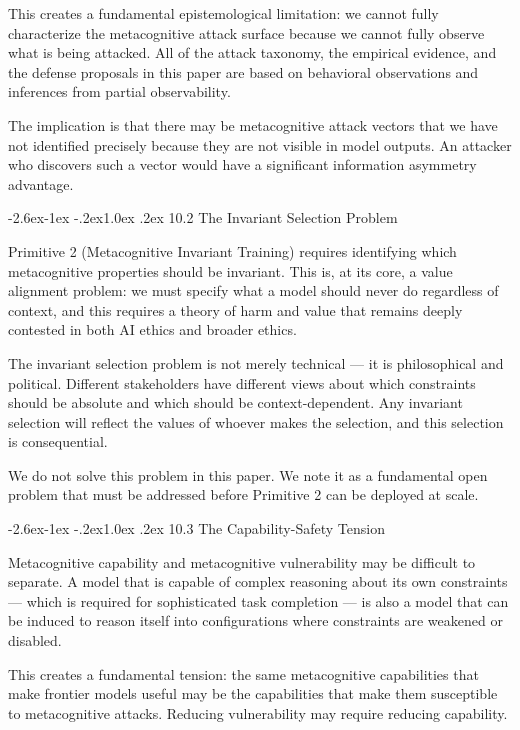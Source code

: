 \documentclass[
  11pt,
]{article}
\makeatletter
\renewcommand\subsection{\@startsection{subsection}{2}{\z@}%
  {-2.6ex\@plus -1ex \@minus -.2ex}{1.0ex \@plus .2ex}%
  {\normalfont\sffamily\large\bfseries}}
\makeatother
\begin{document}
This creates a fundamental epistemological limitation: we cannot fully
characterize the metacognitive attack surface because we cannot fully
observe what is being attacked. All of the attack taxonomy, the
empirical evidence, and the defense proposals in this paper are based on
behavioral observations and inferences from partial observability.

The implication is that there may be metacognitive attack vectors that
we have not identified precisely because they are not visible in model
outputs. An attacker who discovers such a vector would have a
significant information asymmetry advantage.

\subsection{10.2 The Invariant Selection
Problem}\label{the-invariant-selection-problem}

Primitive 2 (Metacognitive Invariant Training) requires identifying
which metacognitive properties should be invariant. This is, at its
core, a value alignment problem: we must specify what a model should
never do regardless of context, and this requires a theory of harm and
value that remains deeply contested in both AI ethics and broader
ethics.

The invariant selection problem is not merely technical --- it is
philosophical and political. Different stakeholders have different views
about which constraints should be absolute and which should be
context-dependent. Any invariant selection will reflect the values of
whoever makes the selection, and this selection is consequential.

We do not solve this problem in this paper. We note it as a fundamental
open problem that must be addressed before Primitive 2 can be deployed
at scale.

\subsection{10.3 The Capability-Safety
Tension}\label{the-capability-safety-tension}

Metacognitive capability and metacognitive vulnerability may be
difficult to separate. A model that is capable of complex reasoning
about its own constraints --- which is required for sophisticated task
completion --- is also a model that can be induced to reason itself into
configurations where constraints are weakened or disabled.

This creates a fundamental tension: the same metacognitive capabilities
that make frontier models useful may be the capabilities that make them
susceptible to metacognitive attacks. Reducing vulnerability may require
reducing capability.
\end{document}
